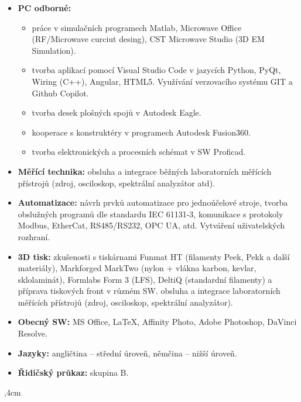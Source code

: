 \documentclass[10pt]{article}
\begin{document}
\begin{itemize}
    \item \textbf{PC odborné:} 
    \begin{itemize}
        \item práce v simulačních programech Matlab, Microwave Office (RF/Microwave curciut desing), CST Microwave Studio (3D EM Simulation).
        \item tvorba aplikací pomocí Visual Studio Code v jazycích Python, PyQt, Wiring (C++), Angular, HTML5. Využívání verzovacího systému GIT a Github Copilot.
        \item tvorba desek plošných spojů v Autodesk Eagle.
        \item kooperace s konstruktéry v programech Autodesk Fusion360.
        \item tvorba elektronických a procesních schémat v SW Proficad.
    \end{itemize}
    \item \textbf{Měřící technika:} obsluha a integrace běžných laboratorních měřících přístrojů (zdroj, osciloskop, spektrální analyzátor atd).
    \item \textbf{Automatizace:} návrh prvků automatizace pro jednoúčelové stroje, tvorba obslužných programů dle standardu IEC 61131-3, 
    komunikace s protokoly Modbus, EtherCat, RS485/RS232, OPC UA, atd. Vytváření uživatelských rozhraní.
    \item \textbf{3D tisk:} zkušenosti s tiskárnami Funmat HT (filamenty Peek, Pekk a další materiály), Markforged MarkTwo (nylon + vlákna karbon, kevlar, sklolaminát), Formlabs Form 3 (LFS), DeltiQ (standardní filamenty) a příprava tiskových front v různém SW. 
    obsluha a integrace laboratorních měřících přístrojů (zdroj, osciloskop, spektrální analyzátor).
    \item \textbf{Obecný SW:} MS Office, \uv\LaTeX, Affinity Photo, Adobe Photoshop, DaVinci Resolve.
    \item \textbf{Jazyky:} angličtina – střední úroveň, němčina – nižší úroveň.
    \item \textbf{Řidičský průkaz:} skupina B.
\end{itemize}

\noindent\hrulefill
{},4cm
\end{document}
